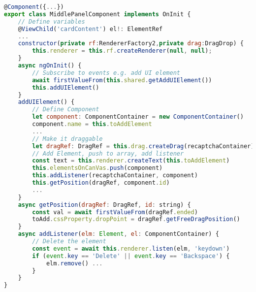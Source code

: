 \begin{lstlisting}[language=JavaScript, caption=middle-panel.component.ts, label=listing:implementation:middle]
@Component({...})
export class MiddlePanelComponent implements OnInit {
    // Define variables
    @ViewChild('cardContent') el!: ElementRef
    ...
    constructor(private rf:RendererFactory2,private drag:DragDrop) {
        this.renderer = this.rf.createRenderer(null, null);
    }
    async ngOnInit() {
        // Subscribe to events e.g. add UI element
        await firstValueFrom(this.shared.getAddUIElement())
        this.addUIElement()
    }
    addUIElement() {
        // Define Component
        let component: ComponentContainer = new ComponentContainer()
        component.name = this.toAddElement
        ...
        // Make it draggable
        let dragRef: DragRef = this.drag.createDrag(recaptchaContainer).withBoundaryElement(this.el)
        // Add Element, push to array, add listener
        const text = this.renderer.createText(this.toAddElement)
        this.elementsOnCanVas.push(component)
        this.addListener(recaptchaContainer, component)
        this.getPosition(dragRef, component.id)
        ...
    }
    async getPosition(dragRef: DragRef, id: string) {
        const val = await firstValueFrom(dragRef.ended)
        toAdd.cssProperty.dropPoint = dragRef.getFreeDragPosition()
    }
    async addListener(elm: Element, el: ComponentContainer) {
        // Delete the element 
        const event = await this.renderer.listen(elm, 'keydown')
        if (event.key == 'Delete' || event.key == 'Backspace') {
            elm.remove() ...
        }
    }
}
\end{lstlisting}


